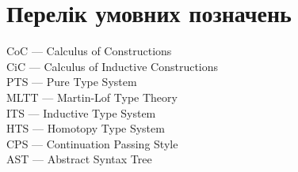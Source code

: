 \chapter*{Перелік умовних позначень}

\noindent CoC --- Calculus of Constructions
\\ CiC --- Calculus of Inductive Constructions
\\ PTS --- Pure Type System
\\ MLTT --- Martin-Lof Type Theory
\\ ITS --- Inductive Type System
\\ HTS --- Homotopy Type System
\\ CPS --- Continuation Passing Style
\\ AST --- Abstract Syntax Tree

